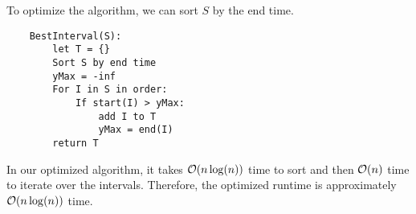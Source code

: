 \documentclass[letterpaper]{article}
\begin{document}
\bigskip 

To optimize the algorithm, we can sort $S$ by the end time. 
\begin{verbatim}
    BestInterval(S):
        let T = {}
        Sort S by end time
        yMax = -inf 
        For I in S in order: 
            If start(I) > yMax: 
                add I to T 
                yMax = end(I)
        return T
\end{verbatim}
In our optimized algorithm, it takes $\mathcal{O}(n\log(n))$ time to sort and then $\mathcal{O}(n)$ time to iterate over the intervals. Therefore, the optimized runtime is approximately $\mathcal{O}(n\log(n))$ time. 
\end{document}
